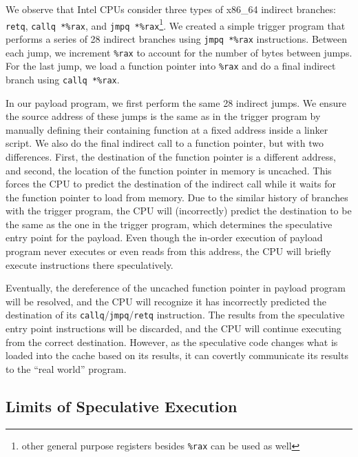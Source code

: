 We observe that Intel CPUs consider three types of x86\_64 indirect branches:
\texttt{retq}, \texttt{callq *\%rax}, and \texttt{jmpq *\%rax}\footnote{other
general purpose registers besides \texttt{\%rax} can be used as well}.
We created a simple trigger program that performs a series of 28 indirect
branches
using \texttt{jmpq *\%rax} instructions. Between each jump, we increment
\texttt{\%rax} to account for the number of bytes between jumps. For the last
jump, we load a function pointer into \texttt{\%rax} and do a final indirect
branch using \texttt{callq *\%rax}.

In our payload program, we first perform the same 28 indirect jumps. We ensure
the source address of these jumps is the same as in the trigger program by
manually defining their containing function at a fixed address inside a linker
script. We also do the final indirect call to a function pointer, but with two
differences. First, the destination of the function pointer is a different
address, and second, the location of the function pointer in memory is uncached.
This forces the CPU to predict the destination of the indirect call while it
waits for the function pointer to load from memory. Due to the similar
history of branches with the trigger program,
the CPU will (incorrectly) predict the destination to be the same as the one in
the trigger program, which determines the speculative entry point for the
payload. Even though the in-order execution of
payload program never executes or even reads from this address, the CPU will
briefly execute instructions there speculatively.

Eventually, the dereference of the uncached function pointer in payload program
will be resolved, and the CPU will recognize it has incorrectly predicted the
destination of its \texttt{callq}/\texttt{jmpq}/\texttt{retq} instruction. The
results from the speculative entry point instructions will be discarded, and the
CPU will continue executing from the correct destination. However, as the
speculative code changes what is loaded into the cache based on its results, it
can covertly communicate its results to the ``real world'' program.



\subsection{Limits of Speculative Execution}

\FigCacheMiss

\FigSpecMeasure

